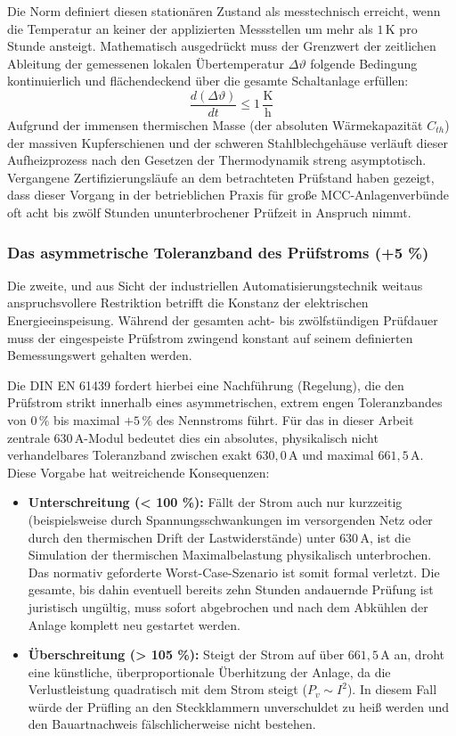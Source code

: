 Die Norm definiert diesen stationären Zustand als messtechnisch erreicht, wenn die Temperatur an keiner der applizierten Messstellen um mehr als $1\,\text{K}$ pro Stunde ansteigt. Mathematisch ausgedrückt muss der Grenzwert der zeitlichen Ableitung der gemessenen lokalen Übertemperatur $\Delta\vartheta$ folgende Bedingung kontinuierlich und flächendeckend über die gesamte Schaltanlage erfüllen:
\begin{equation}
    \frac{d(\Delta\vartheta)}{dt} \le 1\,\frac{\text{K}}{\text{h}}
\end{equation}
Aufgrund der immensen thermischen Masse (der absoluten Wärmekapazität $C_{th}$) der massiven Kupferschienen und der schweren Stahlblechgehäuse verläuft dieser Aufheizprozess nach den Gesetzen der Thermodynamik streng asymptotisch. Vergangene Zertifizierungsläufe an dem betrachteten Prüfstand haben gezeigt, dass dieser Vorgang in der betrieblichen Praxis für große MCC-Anlagenverbünde oft acht bis zwölf Stunden ununterbrochener Prüfzeit in Anspruch nimmt.
\subsubsection{Das asymmetrische Toleranzband des Prüfstroms (+5 \%)}
Die zweite, und aus Sicht der industriellen Automatisierungstechnik weitaus anspruchsvollere Restriktion betrifft die Konstanz der elektrischen Energieeinspeisung. Während der gesamten acht- bis zwölfstündigen Prüfdauer muss der eingespeiste Prüfstrom zwingend konstant auf seinem definierten Bemessungswert gehalten werden.

Die DIN EN 61439 fordert hierbei eine Nachführung (Regelung), die den Prüfstrom strikt innerhalb eines asymmetrischen, extrem engen Toleranzbandes von $0\,\%$ bis maximal $+5\,\%$ des Nennstroms führt. Für das in dieser Arbeit zentrale $630\,\text{A}$-Modul bedeutet dies ein absolutes, physikalisch nicht verhandelbares Toleranzband zwischen exakt $630,0\,\text{A}$ und maximal $661,5\,\text{A}$. Diese Vorgabe hat weitreichende Konsequenzen:
\begin{itemize}
    \item \textbf{Unterschreitung (< 100 \%):} Fällt der Strom auch nur kurzzeitig (beispielsweise durch Spannungsschwankungen im versorgenden Netz oder durch den thermischen Drift der Lastwiderstände) unter $630\,\text{A}$, ist die Simulation der thermischen Maximalbelastung physikalisch unterbrochen. Das normativ geforderte Worst-Case-Szenario ist somit formal verletzt. Die gesamte, bis dahin eventuell bereits zehn Stunden andauernde Prüfung ist juristisch ungültig, muss sofort abgebrochen und nach dem Abkühlen der Anlage komplett neu gestartet werden.
    \item \textbf{Überschreitung (> 105 \%):} Steigt der Strom auf über $661,5\,\text{A}$ an, droht eine künstliche, überproportionale Überhitzung der Anlage, da die Verlustleistung quadratisch mit dem Strom steigt ($P_v \sim I^2$). In diesem Fall würde der Prüfling an den Steckklammern unverschuldet zu heiß werden und den Bauartnachweis fälschlicherweise nicht bestehen.
\end{itemize}

